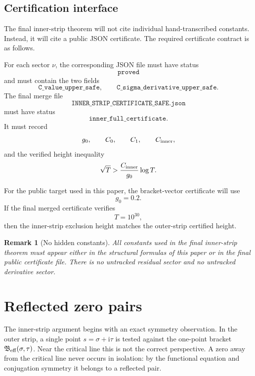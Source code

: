 \documentclass[11pt]{article}
\newtheorem{remark}[theorem]{Remark}
\newcommand{\ii}{\mathrm{i}}
\newcommand{\Beff}{\mathfrak B_{\rm eff}}
\newcommand{\gev}{g_0}
\newcommand{\Cinner}{C_{\rm inner}}
\newcommand{\Czero}{C_0}
\newcommand{\Cone}{C_1}
\begin{document}
\subsection{Certification interface}

The final inner-strip theorem will not cite individual hand-transcribed
constants.  Instead, it will cite a public JSON certificate.  The required
certificate contract is as follows.

For each sector \(\nu\), the corresponding JSON file must have status
\[
        \texttt{proved}
\]
and must contain the two fields
\[
        \texttt{C\_value\_upper\_safe},
        \qquad
        \texttt{C\_sigma\_derivative\_upper\_safe}.
\]
The final merge file
\[
        \texttt{INNER\_STRIP\_CERTIFICATE\_SAFE.json}
\]
must have status
\[
        \texttt{inner\_full\_certificate}.
\]
It must record
\[
        \gev,
        \qquad
        \Czero,
        \qquad
        \Cone,
        \qquad
        \Cinner,
\]
and the verified height inequality
\[
        \sqrt T
        >
        \frac{\Cinner}{\gev}\log T.
\]

For the public target used in this paper, the bracket-vector certificate will
use
\[
        \gev=0.2.
\]
If the final merged certificate verifies
\[
        T=10^{30},
\]
then the inner-strip exclusion height matches the outer-strip certified height.

\begin{remark}[No hidden constants]
All constants used in the final inner-strip theorem must appear either in the
structural formulas of this paper or in the final public certificate file.
There is no untracked residual sector and no untracked derivative sector.
\end{remark}


\section{Reflected zero pairs}
\label{sec:reflected-zero-pairs}

The inner-strip argument begins with an exact symmetry observation.  In the
outer strip, a single point \(s=\sigma+\ii\tau\) is tested against the
one-point bracket \(\Beff(\sigma,\tau)\).  Near the critical line this is not
the correct perspective.  A zero away from the critical line never occurs in
isolation: by the functional equation and conjugation symmetry it belongs to a
reflected pair.
\end{document}
